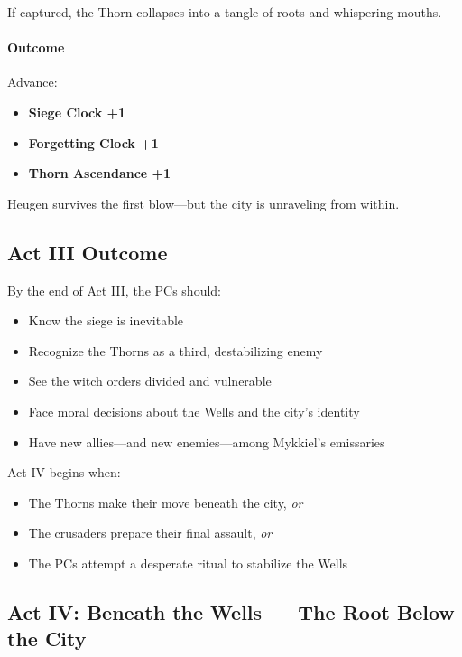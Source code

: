 \documentclass[11pt]{book}
\begin{document}
If captured, the Thorn collapses into a tangle of roots and whispering mouths.

\paragraph{Outcome}
Advance:
\begin{itemize}
    \item \textbf{Siege Clock +1}
    \item \textbf{Forgetting Clock +1}
    \item \textbf{Thorn Ascendance +1}
\end{itemize}

Heugen survives the first blow---but the city is unraveling from within.

\subsection*{Act III Outcome}

By the end of Act III, the PCs should:
\begin{itemize}
    \item Know the siege is inevitable
    \item Recognize the Thorns as a third, destabilizing enemy
    \item See the witch orders divided and vulnerable
    \item Face moral decisions about the Wells and the city's identity
    \item Have new allies---and new enemies---among Mykkiel's emissaries
\end{itemize}

Act IV begins when:
\begin{itemize}
    \item The Thorns make their move beneath the city, \emph{or}
    \item The crusaders prepare their final assault, \emph{or}
    \item The PCs attempt a desperate ritual to stabilize the Wells
\end{itemize}

\subsection{Act IV: Beneath the Wells --- The Root Below the City}
\end{document}
